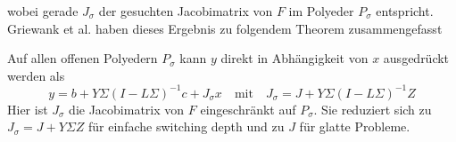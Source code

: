 wobei gerade $J_\sigma$ der gesuchten Jacobimatrix von $F$ im Polyeder $P_\sigma$ entspricht. 
Griewank et al. haben dieses Ergebnis zu folgendem Theorem \cite[Proposition 2.2]{plan} zusammengefasst   
\begin{theorem}
Auf allen offenen Polyedern $P_\sigma$ kann $y$ direkt in Abhängigkeit von $x$ ausgedrückt werden als
\begin{equation}
y = b+Y\Sigma(I-L\Sigma)^{-1}c + J_\sigma x  \quad \text{mit} \quad J_\sigma = J+Y\Sigma(I-L\Sigma)^{-1} Z
\label{eq:explJacRepresentation}
\end{equation}
Hier ist $J_\sigma$ die Jacobimatrix von $F$ eingeschränkt auf $P_\sigma$. Sie reduziert sich zu $J_\sigma=J+Y\Sigma Z$ für einfache switching depth und zu $J$ für glatte Probleme.
\end{theorem}

% 


